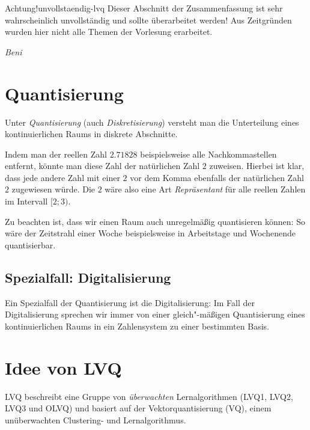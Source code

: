 \begin{hint}{Achtung!}{unvollstaendig-lvq}
	Dieser Abschnitt der Zusammenfassung ist sehr wahrscheinlich unvollständig und sollte überarbeitet werden!
	Aus Zeitgründen wurden hier nicht alle Themen der Vorlesung erarbeitet.
	\begin{flushright}\textit{Beni}\end{flushright}
\end{hint}
\section*{Quantisierung}
Unter \emph{Quantisierung} (auch \emph{Diskretisierung}) versteht man die Unterteilung eines kontinuierlichen Raums in diskrete Abschnitte.

Indem man der reellen Zahl $2.71828$ beispielsweise alle Nachkommastellen entfernt, könnte man diese Zahl der natürlichen Zahl $2$ zuweisen. Hierbei ist klar, dass jede andere Zahl mit einer $2$ vor dem Komma ebenfalls der natürlichen Zahl $2$ zugewiesen würde. Die $2$ wäre also eine Art \emph{Repräsentant} für alle reellen Zahlen im Intervall $[2; 3)$.

Zu beachten ist, dass wir einen Raum auch unregelmäßig quantisieren können: So wäre der Zeitstrahl einer Woche beispielsweise in Arbeitstage und Wochenende quantisierbar.

\subsection*{Spezialfall: Digitalisierung}
Ein Spezialfall der Quantisierung ist die Digitalisierung: Im Fall der Digitalisierung sprechen wir immer von einer gleich"-mäßigen Quantisierung eines kontinuierlichen Raums in ein Zahlensystem zu einer bestimmten Basis.



\section*{Idee von LVQ}
LVQ beschreibt eine Gruppe von \emph{überwachten} Lernalgorithmen (LVQ1, LVQ2, LVQ3 und OLVQ) und basiert auf der Vektorquantisierung (VQ), einem unüberwachten Clustering- und Lernalgorithmus.

